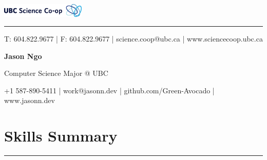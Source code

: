 \documentclass[letterpaper]{article}
\newcommand{\sectcolor}{cyan}
\newcommand{\sect}[1]{\section*{#1}
                        {\color{\sectcolor}
                        \rule{\textwidth}{1pt}
                        \vspace{-1ex}}}
\begin{document}
    \begin{flushright}
        \includegraphics[width=0.3\textwidth]{ScienceCo-opLogo_UBC_H.eps}
    \end{flushright}

    \vspace{-2ex}
    \begin{minipage}{\dimexpr(\textwidth-44pt)}
        \begin{flushright}
        {\color{ubclightblue}\rule{\textwidth}{0.5pt}}

        {\small\color{ubcblue}
          T: 604.822.9677
        | F: 604.822.9677
        | science.coop@ubc.ca
        | www.sciencecoop.ubc.ca}
        \end{flushright}
    \end{minipage}

    {\LARGE
    \textbf{Jason Ngo}}

    \vspace{1ex}
    {Computer Science Major @ UBC}

    {\small
      +1 587-890-5411
    | work@jasonn.dev
    | github.com/Green-Avocado
    | www.jasonn.dev
    }
    \vspace{1ex}

    \setlength{\parskip}{-2pt}

    \sect{Skills Summary}
\end{document}
